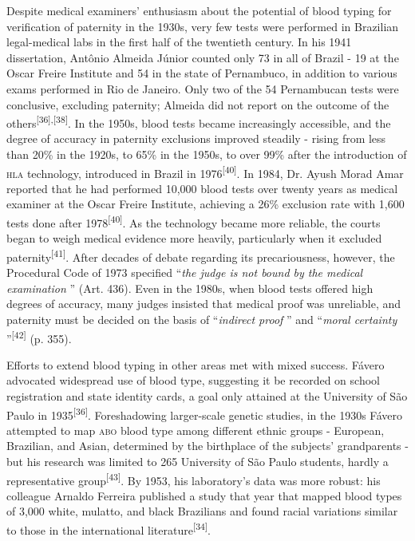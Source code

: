 \documentclass{article}
\begin{document}
Despite medical examiners’ enthusiasm about the potential of blood typing for
verification of paternity in the 1930s, very few tests were performed in
Brazilian legal-medical labs in the first half of the twentieth century. In his
1941 dissertation, Antônio Almeida Júnior counted only 73 in all of Brazil - 19
at the Oscar Freire Institute and 54 in the state of Pernambuco, in addition to
various exams performed in Rio de Janeiro. Only two of the 54 Pernambucan tests
were conclusive, excluding paternity; Almeida did not report on the outcome of
the others\textsuperscript{[}\textsuperscript{36}\textsuperscript{]}\textsuperscript{,}\textsuperscript{[}\textsuperscript{38}\textsuperscript{]}. In the 1950s, blood tests became increasingly accessible, and the degree of
accuracy in paternity exclusions improved steadily - rising from less than 20\%
in the 1920s, to 65\% in the 1950s, to over 99\% after the introduction of \textsc{hla}
technology, introduced in Brazil in 1976\textsuperscript{[}\textsuperscript{40}\textsuperscript{]}. In 1984, Dr. Ayush Morad Amar reported that he had performed 10,000 blood
tests over twenty years as medical examiner at the Oscar Freire Institute,
achieving a 26\% exclusion rate with 1,600 tests done after 1978\textsuperscript{[}\textsuperscript{40}\textsuperscript{]}. As the technology became more reliable, the courts began to weigh medical
evidence more heavily, particularly when it excluded paternity\textsuperscript{[}\textsuperscript{41}\textsuperscript{]}. After decades of debate regarding its precariousness, however, the Procedural
Code of 1973 specified “\textit{the judge is not bound by the medical
examination}
” (Art. 436). Even in the 1980s, when blood tests offered high degrees of
accuracy, many judges insisted that medical proof was unreliable, and paternity
must be decided on the basis of “\textit{indirect proof}
” and “\textit{moral certainty}
”\textsuperscript{[}\textsuperscript{42}\textsuperscript{]}
(p. 355).

Efforts to extend blood typing in other areas met with mixed success. Fávero
advocated widespread use of blood type, suggesting it be recorded on school
registration and state identity cards, a goal only attained at the University of
São Paulo in 1935\textsuperscript{[}\textsuperscript{36}\textsuperscript{]}. Foreshadowing larger-scale genetic studies, in the 1930s Fávero attempted to
map \textsc{abo} blood type among different ethnic groups - European, Brazilian, and
Asian, determined by the birthplace of the subjects’ grandparents - but his
research was limited to 265 University of São Paulo students, hardly a
representative group\textsuperscript{[}\textsuperscript{43}\textsuperscript{]}. By 1953, his laboratory’s data was more robust: his colleague Arnaldo Ferreira
published a study that year that mapped blood types of 3,000 white, mulatto, and
black Brazilians and found racial variations similar to those in the
international literature\textsuperscript{[}\textsuperscript{34}\textsuperscript{]}.
\end{document}
